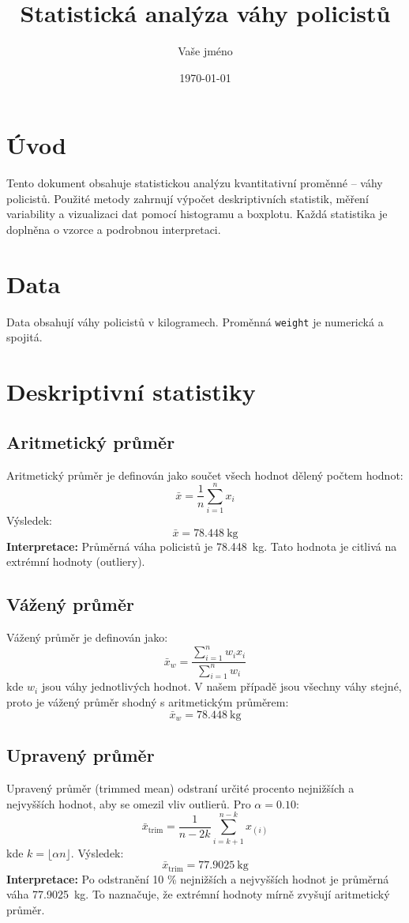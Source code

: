 \documentclass{article}
\title{Statistická analýza váhy policistů}
\author{Vaše jméno}
\date{\today}
\begin{document}
\maketitle

\section{Úvod}
Tento dokument obsahuje statistickou analýzu kvantitativní proměnné – váhy policistů. Použité metody zahrnují výpočet deskriptivních statistik, měření variability a vizualizaci dat pomocí histogramu a boxplotu. Každá statistika je doplněna o vzorce a podrobnou interpretaci.

\section{Data}
Data obsahují váhy policistů v kilogramech. Proměnná \texttt{weight} je numerická a spojitá.

\section{Deskriptivní statistiky}

\subsection{Aritmetický průměr}
Aritmetický průměr je definován jako součet všech hodnot dělený počtem hodnot:
\[
\bar{x} = \frac{1}{n} \sum_{i=1}^{n} x_i
\]
Výsledek:
\[
\bar{x} = \SI{78.448}{\kilo\gram}
\]
\textbf{Interpretace:} Průměrná váha policistů je \SI{78.448}{\kilo\gram}. Tato hodnota je citlivá na extrémní hodnoty (outliery).

\subsection{Vážený průměr}
Vážený průměr je definován jako:
\[
\bar{x}_w = \frac{\sum_{i=1}^{n} w_i x_i}{\sum_{i=1}^{n} w_i}
\]
kde \( w_i \) jsou váhy jednotlivých hodnot. V našem případě jsou všechny váhy stejné, proto je vážený průměr shodný s aritmetickým průměrem:
\[
\bar{x}_w = \SI{78.448}{\kilo\gram}
\]

\subsection{Upravený průměr}
Upravený průměr (trimmed mean) odstraní určité procento nejnižších a nejvyšších hodnot, aby se omezil vliv outlierů. Pro \( \alpha = 0.10 \):
\[
\bar{x}_{\text{trim}} = \frac{1}{n - 2k} \sum_{i=k+1}^{n-k} x_{(i)}
\]
kde \( k = \lfloor \alpha n \rfloor \). Výsledek:
\[
\bar{x}_{\text{trim}} = \SI{77.9025}{\kilo\gram}
\]
\textbf{Interpretace:} Po odstranění 10 \% nejnižších a nejvyšších hodnot je průměrná váha \SI{77.9025}{\kilo\gram}. To naznačuje, že extrémní hodnoty mírně zvyšují aritmetický průměr.
\end{document}
